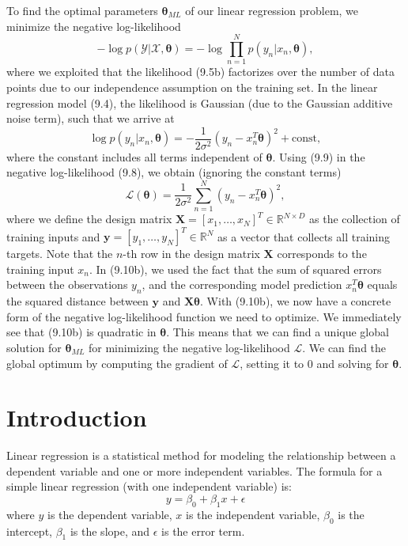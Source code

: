 \documentclass[12pt,openany]{book}
\theoremstyle{definition}
\begin{document}
	To find the optimal parameters $\boldsymbol{\theta}_{ML}$ of our linear regression problem, we minimize the negative log-likelihood
	\begin{equation}
		-\log p(\mathcal{Y} | \mathcal{X}, \boldsymbol{\theta}) = -\log \prod_{n=1}^{N} p(y_n | x_n, \boldsymbol{\theta}),
	\end{equation}
	where we exploited that the likelihood (9.5b) factorizes over the number of data points due to our independence assumption on the training set. In the linear regression model (9.4), the likelihood is Gaussian (due to the Gaussian additive noise term), such that we arrive at
	\begin{equation}
		\log p(y_n | x_n, \boldsymbol{\theta}) = -\frac{1}{2\sigma^2} (y_n - x_n^T \boldsymbol{\theta})^2 + \text{const},
	\end{equation}
	where the constant includes all terms independent of $\boldsymbol{\theta}$. Using (9.9) in the negative log-likelihood (9.8), we obtain (ignoring the constant terms)
	\begin{equation}
		\mathcal{L}(\boldsymbol{\theta}) = \frac{1}{2\sigma^2} \sum_{n=1}^{N} (y_n - x_n^T \boldsymbol{\theta})^2,
	\end{equation}
	where we define the design matrix $\mathbf{X} = [x_1, \dots, x_N]^T \in \mathbb{R}^{N \times D}$ as the collection of training inputs and $\mathbf{y} = [y_1, \dots, y_N]^T \in \mathbb{R}^N$ as a vector that collects all training targets. Note that the $n$-th row in the design matrix $\mathbf{X}$ corresponds to the training input $x_n$. In (9.10b), we used the fact that the sum of squared errors between the observations $y_n$, and the corresponding model prediction $x_n^T \boldsymbol{\theta}$ equals the squared distance between $\mathbf{y}$ and $\mathbf{X} \boldsymbol{\theta}$. With (9.10b), we now have a concrete form of the negative log-likelihood function we need to optimize. We immediately see that (9.10b) is quadratic in $\boldsymbol{\theta}$. This means that we can find a unique global solution for $\boldsymbol{\theta}_{ML}$ for minimizing the negative log-likelihood $\mathcal{L}$. We can find the global optimum by computing the gradient of $\mathcal{L}$, setting it to 0 and solving for $\boldsymbol{\theta}$.
	
	
	\section{Introduction}
	Linear regression is a statistical method for modeling the relationship between a dependent variable and one or more independent variables. The formula for a simple linear regression (with one independent variable) is:
	\begin{equation}
		y = \beta_0 + \beta_1x + \epsilon
	\end{equation}
	where $y$ is the dependent variable, $x$ is the independent variable, $\beta_0$ is the intercept, $\beta_1$ is the slope, and $\epsilon$ is the error term.
	
\end{document}
